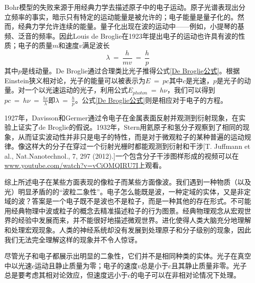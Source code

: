 \documentclass[12pt,a4paper,openany]{ctexbook}
\begin{document}
\begin{flushleft}
Bohr模型的失败来源于用经典力学去描述原子中的电子运动。原子光谱表现出分立频率的事实，暗示只有特定的运动能量是被允许的；电子能量是量子化的。然而，经典力学允许连续的能量。量子化出现在波的运动中——例如，小提琴的基频、泛音的频率。因此Louis de Broglie在1923年提出电子的运动也许具有波的性质；电子的质量$m$和速度$v$满足波长
\begin{equation}
\lambda\ =\ \frac{h}{mv}\ =\ \frac{h}{p}
\label{De Broglie公式}
\end{equation}
其中$p$是线动量。De Broglie通过合理类比光子推得公式\eqref{De Broglie公式}。根据Einstein狭义相对论，光子的能量可以被表示为$E\ =\ pc$其中$c$是光速，$p$是光子的动量。对一个以光速运动的光子，利用公式$E_{photon}\ =\ h\nu$，我们可以得到$pc\ =\ h\nu\ =\ \frac{hc}{\lambda}$即$\lambda\ =\ \frac{h}{p}$。公式\eqref{De Broglie公式}则是相应对于电子的方程。

1927年，Davisson和Germer通过令电子在金属表面反射并观测到衍射现象，在实验上证实了de Broglie的假说。1932年，Stern用氦原子和氢分子观察到了相同的现象，从而证实波动性并非只是电子的特性，而是对于微观粒子的某种普遍的运动规律。像这样大的分子在穿过一个衍射光栅时都能观测到衍射和干涉[T. Juffmann et al., Nat.Nanotechnol., 7, 297 (2012).]一个包含分子干涉图样形成的视频可以在\url{www.youtube.com/watch?v=vCiOMQIRU7I}上观看。

综上所述电子在某些方面表现的像粒子而某些方面像波。我们遇到一种物质（以及光）明显矛盾的的“波粒二象性”。电子怎么能既是波，一种定域的实体，又是非定域的波？答案是一个电子既不是波也不是粒子，而是一种其他的存在形式。不可能用经典物理中波或粒子的概念去精准描述粒子的行为图景。经典物理观念从宏观世界的经验中发展而来，并不能很好地描述微观世界。进化使得人类大脑充分地理解和处理宏观现象。人类的神经系统却没有发展到处理原子和分子级别的现象，因此我们无法完全理解这样的现象并不令人惊讶。

尽管光子和电子都展示出明显的二象性，它们并不是相同种类的实体。光子在真空中以光速$c$运动且静止质量为零；电子的速度$v$总是小于$c$且其静止质量非零。光子总是要考虑其相对论效应，但速度远小于$c$的电子可以在非相对论情况下处理。
\end{flushleft}
\end{document}
